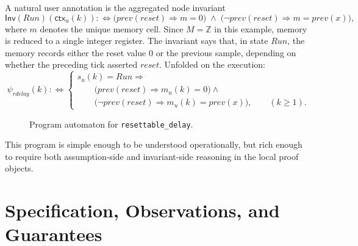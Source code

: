 \documentclass[11pt,a4paper]{article}
\newcommand{\UserInv}{\mathsf{Inv}}
\newcommand{\ctx}{\mathsf{ctx}}
\begin{document}
A natural user annotation is the aggregated node invariant
\[
\UserInv(Run)(\ctx_u(k)) :\Longleftrightarrow
\bigl(prev(reset) \Rightarrow m = 0\bigr)
\;\land\;
\bigl(\neg prev(reset) \Rightarrow m = prev(x)\bigr),
\]
where \(m\) denotes the unique memory cell. Since \(M=\mathbb{Z}\) in this
example, memory is reduced to a single integer register. The invariant says
that, in state \(Run\), the memory records either the reset value \(0\) or the
previous sample, depending on whether the preceding tick asserted \(reset\).
Unfolded on the execution:
\[
\psi_{rdelay}(k) :\Longleftrightarrow
\left\{
\begin{array}{l}
s_u(k)=Run \Rightarrow {}\\
\qquad \bigl(prev(reset) \Rightarrow m_u(k)=0\bigr) \land {}\\
\qquad \bigl(\neg prev(reset) \Rightarrow m_u(k)=prev(x)\bigr),
\qquad (k \ge 1).
\end{array}
\right.
\]

\begin{figure}[ht]
\centering
{}
\caption{Program automaton for \texttt{resettable\_delay}.}
\end{figure}

This program is simple enough to be understood operationally, but rich enough
to require both assumption-side and invariant-side reasoning in the local proof
objects.

\section{Specification, Observations, and Guarantees}
\end{document}
